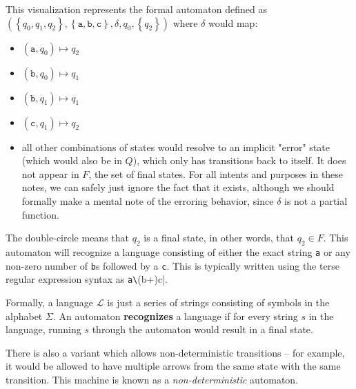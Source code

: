 \documentclass{article}
\theoremstyle{plain}
\theoremstyle{definition}
\begin{document}
\begin{center}
\end{center}


This visualization represents the formal automaton defined as \ensuremath{\left( \left\{ {q}_{0}, {q}_{1}, {q}_{2} \right\}, \left\{ \mathtt{a}, \mathtt{b}, \mathtt{c} \right\}, \delta , {q}_{0}, \left\{ {q}_{2} \right\} \right)} where \ensuremath{\delta} would map: \begin{itemize}
\item \ensuremath{\left( \mathtt{a}, {q}_{0} \right) \mapsto {q}_{2}}
\item \ensuremath{\left( \mathtt{b}, {q}_{0} \right) \mapsto {q}_{1}}
\item \ensuremath{\left( \mathtt{b}, {q}_{1} \right) \mapsto {q}_{1}}
\item \ensuremath{\left( \mathtt{c}, {q}_{1} \right) \mapsto {q}_{2}}
\item all other combinations of states would resolve to an implicit "error" state (which would also be in \ensuremath{Q}), which only has transitions back to itself. It does not appear in \ensuremath{F}, the set of final states. For all intents and purposes in these notes, we can safely just ignore the fact that it exists, although we should formally make a mental note of the erroring behavior, since \ensuremath{\delta} is not a partial function.
\end{itemize}


The double-circle means that \ensuremath{{q}_{2}} is a final state, in other words, that \ensuremath{{q}_{2} \in F}. This automaton will recognize a language consisting of either the exact string \verb|a| or any non-zero number of \verb|b|s followed by a \verb|c|. This is typically written using the terse regular expression syntax as \verb|a\|(b+)c|.

Formally, a language \ensuremath{\mathcal{L}} is just a series of strings consisting of symbols in the alphabet \ensuremath{\Sigma}. An automaton \textbf{recognizes} a language if for every string \ensuremath{s} in the language, running \ensuremath{s} through the automaton would result in a final state.

There is also a variant which allows non-deterministic transitions -- for example, it would be allowed to have multiple arrows from the same state with the same transition. This machine is known as a \emph{non-deterministic} automaton.
\end{document}
